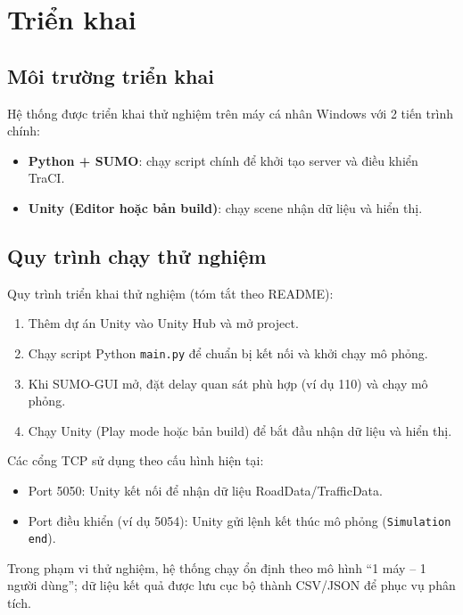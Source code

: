 \documentclass[../DoAn.tex]{subfiles}
\begin{document}
\section{Triển khai}
\subsection*{Môi trường triển khai}
Hệ thống được triển khai thử nghiệm trên máy cá nhân Windows với 2 tiến trình chính:
\begin{itemize}
	\item \textbf{Python + SUMO}: chạy script chính để khởi tạo server và điều khiển TraCI.
	\item \textbf{Unity (Editor hoặc bản build)}: chạy scene nhận dữ liệu và hiển thị.
\end{itemize}

\subsection*{Quy trình chạy thử nghiệm}
Quy trình triển khai thử nghiệm (tóm tắt theo README):
\begin{enumerate}
	\item Thêm dự án Unity vào Unity Hub và mở project.
	\item Chạy script Python \texttt{main.py} để chuẩn bị kết nối và khởi chạy mô phỏng.
	\item Khi SUMO-GUI mở, đặt delay quan sát phù hợp (ví dụ 110) và chạy mô phỏng.
	\item Chạy Unity (Play mode hoặc bản build) để bắt đầu nhận dữ liệu và hiển thị.
\end{enumerate}

Các cổng TCP sử dụng theo cấu hình hiện tại:
\begin{itemize}
	\item Port 5050: Unity kết nối để nhận dữ liệu RoadData/TrafficData.
	\item Port điều khiển (ví dụ 5054): Unity gửi lệnh kết thúc mô phỏng (\texttt{Simulation end}).
\end{itemize}

Trong phạm vi thử nghiệm, hệ thống chạy ổn định theo mô hình ``1 máy -- 1 người dùng''; dữ liệu kết quả được lưu cục bộ thành CSV/JSON để phục vụ phân tích.
\end{document}
